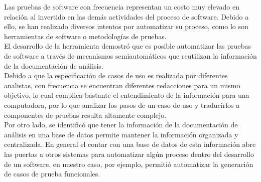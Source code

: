 	Las pruebas de software con frecuencia representan un costo muy elevado en relación al invertido en las demás actividades del proceso de software. Debido a ello, se han realizado diversos intentos por automatizar su proceso, como lo son herramientas de software o metodologías de pruebas.\\

	El desarrollo de la herramienta demostró que es posible automatizar las pruebas de software a través de mecanismos semiautomáticos que reutilizan la información de la documentación de análisis.\\
	
	Debido a que la especificación de casos de uso es realizada por diferentes analistas, con frecuencia se encuentran diferentes redacciones para un mismo objetivo, lo cual complica bastante el entendimiento de la información para una computadora, por lo que analizar los pasos de un caso de uso y traducirlos a componentes de pruebas resulta altamente complejo.\\
		
	Por otro lado, se identificó que tener la información de la documentación de análisis en una base de datos permite mantener la información organizada y centralizada. En general el contar con una base de datos de esta información abre las puertas a otros sistemas para automatizar algún proceso dentro del desarrollo de un software, en nuestro caso, por ejemplo, permitió automatizar la generación de casos de prueba funcionales.